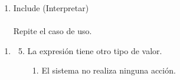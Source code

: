 \begin{framed}
\begin{description}
\begin{enumerate}
\begin {enumerate}
\begin{enumerate}
         \item Include (Interpretar) \\ \\ \hfill
         Repite el caso de uso.
         \end{enumerate}
      \end{enumerate}
   \end{enumerate}
   \begin{enumerate} \itemsep1pt \parskip0pt 
   \setcounter{enumi}{2}
   \renewcommand{\labelenumi}{}
   \renewcommand{\labelenumiii}{\arabic{enumiii}.}
   \renewcommand{\labelenumii}{\arabic{enumi}\alph{enumii}.}
      \item 
      \begin {enumerate}
         \setcounter{enumii}{4}
         \item La expresión tiene otro tipo de valor.
         \begin{enumerate}
         \item El sistema no realiza ninguna acción.
         \end{enumerate}
      \end{enumerate}
   \end{enumerate}
\end{description}
 \FloatBarrier
\end{framed}

